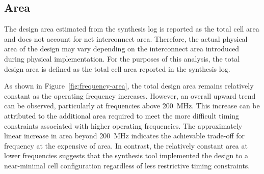 \documentclass[a4paper,11pt]{article}
\begin{document}



\subsection{Area}

The design area estimated from the synthesis log is reported as the total cell area and does not account for net interconnect area. Therefore, the actual physical area of the design may vary depending on the interconnect area introduced during physical implementation. For the purposes of this analysis, the total design area is defined as the total cell area reported in the synthesis log.

As shown in Figure~\ref{fig:frequency-area}, the total design area remains relatively constant as the operating frequency increases. However, an overall upward trend can be observed, particularly at frequencies above 200~MHz. This increase can be attributed to the additional area required to meet the more difficult timing constraints associated with higher operating frequencies. The approximately linear increase in area beyond 200~MHz indicates the achievable trade-off for frequency at the expensive of area. In contrast, the relatively constant area at lower frequencies suggests that the synthesis tool implemented the design to a near-minimal cell configuration regardless of less restrictive timing constraints. 
\end{document}
